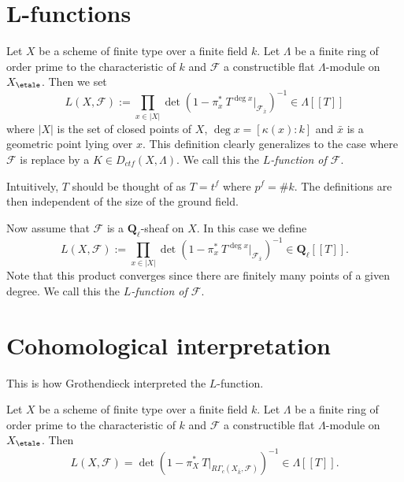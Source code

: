 \section{L-functions}
\label{section-L-function}

\begin{definition}
\label{definition-L-function-finite-ring}
Let $X$ be a scheme of finite type over a finite field $k$. Let $\Lambda$ be a
finite ring of order prime to the characteristic of $k$ and $\mathcal{F}$ a
constructible flat $\Lambda$-module on $X_\etale$. Then we set
$$
L(X, \mathcal{F}) := \prod_{x\in |X|}\det\left(1-\pi_x^*\ T^{\deg
x}\Big|_{\mathcal{F}_{\bar x}}\right)^{-1}\in \Lambda [[ T ]]
$$
where $|X|$ is the set of closed points of $X$, $\deg x = [\kappa(x): k]$ and
$\bar x$ is a geometric point lying over $x$. This definition clearly
generalizes to the case where $\mathcal{F}$ is replace by a
$K \in D_{ctf}(X, \Lambda)$. We call this the {\it $L$-function of
$\mathcal{F}$}.
\end{definition}

\begin{remark}
\label{remark-T}
Intuitively, $T$ should be thought of as $T = t^f$ where $p^f = \# k$. The
definitions are then independent of the size of the ground field.
\end{remark}

\begin{definition}
\label{definition-L-function-l-adic}
Now assume that $\mathcal{F}$ is a $\mathbf{Q}_\ell$-sheaf on $X$.
In this case we define
$$
L(X, \mathcal{F}) := \prod_{x\in |X|}\det\left(1-\pi_x^*\ T^{\deg
x}\Big|_{\mathcal{F}_{\bar x}}\right)^{-1}\in \mathbf{Q}_\ell [[ T ]].
$$
Note that this product converges since there are finitely many points of a
given degree. We call this the {\it $L$-function of
$\mathcal{F}$}.
\end{definition}




\section{Cohomological interpretation}
\label{section-L-cohomological}

\noindent
This is how Grothendieck interpreted the $L$-function.

\begin{theorem}
\label{theorem-A}
Let $X$ be a scheme of finite type over a finite field $k$. Let $\Lambda$ be a
finite ring of order prime to the characteristic of $k$ and $\mathcal{F}$ a
constructible flat $\Lambda$-module on $X_\etale$. Then
$$
L(X, \mathcal{F}) = \det\left(1-\pi_X^*\ T\Big|_{R\Gamma_c(X_{\bar k},
\mathcal{F})}\right)^{-1}\in \Lambda[[ T]].
$$
\end{theorem}

